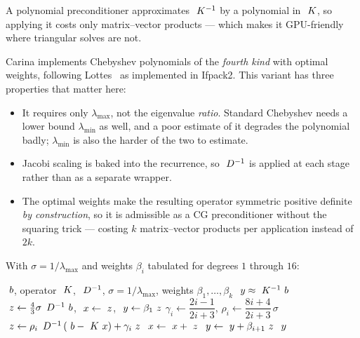 A polynomial preconditioner approximates $~K^{-1}$ by a polynomial in
$~K$, so applying it costs only matrix--vector products --- which makes it
GPU-friendly where triangular solves are not.

Carina implements Chebyshev polynomials of the \emph{fourth kind} with optimal
weights, following Lottes~\cite{Lottes2022} as implemented in Ifpack2.  This
variant has three properties that matter here:

\begin{itemize}
  \item It requires only $\lambda_{\max}$, not the eigenvalue \emph{ratio}.
        Standard Chebyshev needs a lower bound $\lambda_{\min}$ as well, and a
        poor estimate of it degrades the polynomial badly; $\lambda_{\min}$ is
        also the harder of the two to estimate.
  \item Jacobi scaling is baked into the recurrence, so $~D^{-1}$ is applied
        at each stage rather than as a separate wrapper.
  \item The optimal weights make the resulting operator symmetric positive
        definite \emph{by construction}, so it is admissible as a CG
        preconditioner without the squaring trick --- costing $k$ matrix--vector
        products per application instead of $2k$.
\end{itemize}

With $\sigma = 1/\lambda_{\max}$ and weights $\beta_i$ tabulated for degrees
$1$ through $16$:

\begin{algorithm}[h]
\caption{Fourth-kind Chebyshev preconditioner application, degree $k$}
\label{alg:chebyshev}
\begin{algorithmic}[1]
  \Require $~b$, operator $~K$, $~D^{-1}$, $\sigma = 1/\lambda_{\max}$,
           weights $\beta_1,\dots,\beta_k$
  \Ensure $~y \approx ~K^{-1}~b$
  \State $~z \gets \tfrac43\sigma\,~D^{-1}~b$,\quad
         $~x \gets ~z$,\quad
         $~y \gets \beta_1~z$
    \State $\gamma_i \gets \dfrac{2i-1}{2i+3}$,\qquad
           $\rho_i \gets \dfrac{8i+4}{2i+3}\,\sigma$
    \State $~z \gets \rho_i\,~D^{-1}\left(~b - ~K~x\right)
                            + \gamma_i~z$
    \State $~x \gets ~x + ~z$
    \State $~y \gets ~y + \beta_{i+1}~z$
  \EndFor
  \State \Return $~y$
\end{algorithmic}
\end{algorithm}

